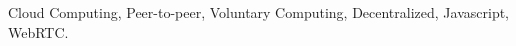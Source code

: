 
% 
% 

\begin{keywords}
Cloud Computing, Peer-to-peer, Voluntary Computing, Decentralized, Javascript, WebRTC.
\end{keywords}
